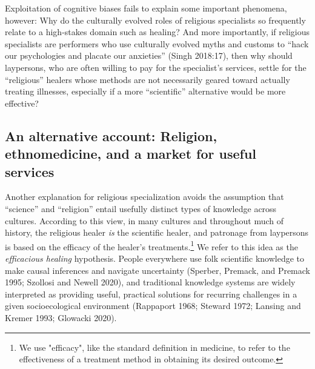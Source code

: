 \documentclass[
  11pt,
]{article}
\begin{document}
Exploitation of cognitive biases fails to explain some important phenomena, however: Why do the culturally evolved roles of religious specialists so frequently relate to a high-stakes domain such as healing? And more importantly, if religious specialists are performers who use culturally evolved myths and customs to ``hack our psychologies and placate our anxieties'' (Singh 2018:17), then why should laypersons, who are often willing to pay for the specialist's services, settle for the ``religious'' healers whose methods are not necessarily geared toward actually treating illnesses, especially if a more ``scientific'' alternative would be more effective?

\hypertarget{an-alternative-account-religion-ethnomedicine-and-a-market-for-useful-services}{%
\subsection{An alternative account: Religion, ethnomedicine, and a market for useful services}\label{an-alternative-account-religion-ethnomedicine-and-a-market-for-useful-services}}

Another explanation for religious specialization avoids the assumption that ``science'' and ``religion'' entail usefully distinct types of knowledge across cultures. According to this view, in many cultures and throughout much of history, the religious healer \emph{is} the scientific healer, and patronage from laypersons is based on the efficacy of the healer's treatments.\footnote{We use "efficacy", like the standard definition in medicine, to refer to the effectiveness of a treatment method in obtaining its desired outcome.} We refer to this idea as the \emph{efficacious healing} hypothesis. People everywhere use folk scientific knowledge to make causal inferences and navigate uncertainty (Sperber, Premack, and Premack 1995; Szollosi and Newell 2020), and traditional knowledge systems are widely interpreted as providing useful, practical solutions for recurring challenges in a given socioecological environment (Rappaport 1968; Steward 1972; Lansing and Kremer 1993; Glowacki 2020).
\end{document}
